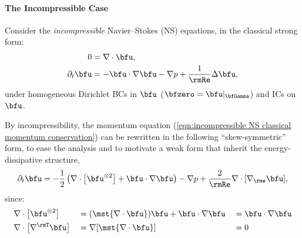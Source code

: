 \paragraph*{The Incompressible Case}
    Consider the \emph{incompressible} Navier–Stokes (NS) equations, in the classical strong form:
    \begin{align}
                       0  &=  \nabla\cdot\bfu,  \label{eqn:incompressible NS mass conservation}  \\
        \partial_{t}\bfu  &=  - \bfu\cdot\nabla\bfu - \nabla p + \frac{1}{\rmRe}\Delta\bfu,  \label{eqn:incompressible NS classical momentum conservation}
    \end{align}
    under homogeneous Dirichlet BCs in $\bfu$ ($\bfzero  =  \bfu|_{\bfGamma}$) and ICs on $\bfu$.

    By incompressibility, the momentum equation (\ref{eqn:incompressible NS classical momentum conservation}) can be rewritten in the following ``skew-symmetric'' form, to ease the analysis and to motivate a weak form that inherit the energy-dissipative structure,
    \begin{equation}\label{eqn:incompressible NS skew-symmetric momentum equation}
        \partial_{t}\bfu  =  - \frac{1}{2}\left(\nabla\cdot\left[\bfu^{\otimes 2}\right] + \bfu\cdot\nabla\bfu\right) - \nabla p + \frac{2}{\rmRe}\nabla\cdot[\nabla_{\rms}\bfu],
    \end{equation}
    since:
    \begin{align}
        &\nabla\cdot\left[\bfu^{\otimes 2}\right]  &&=  (\mst{\nabla\cdot\bfu})\bfu + \bfu\cdot\nabla\bfu  &&=  \bfu\cdot\nabla\bfu  \\
        &\nabla\cdot\left[\nabla^{\rmT}\bfu\right]  &&=  \nabla[\mst{\nabla\cdot\bfu}]  &&=  0
    \end{align}

    \begin{remark}
    \end{remark}
    

